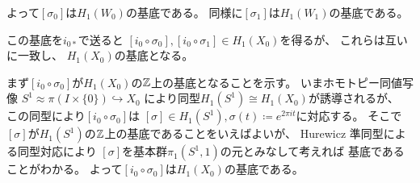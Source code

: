 \documentclass[report]{jlreq}
\begin{document}
\begin{answer}
\begin{innerproof}
        よって$[\sigma_0]$は$H_1(W_0)$の基底である。
        同様に$[\sigma_1]$は$H_1(W_1)$の基底である。
    \end{innerproof}
    この基底を$i_{0*}$で送ると
    $[i_0 \circ \sigma_0], [i_0 \circ \sigma_1] \in H_1(X_0)$を得るが、
    これらは互いに一致し、
    $H_1(X_0)$の基底となる。
    \begin{innerproof}
        まず$[i_0 \circ \sigma_0]$が$H_1(X_0)$の$\mathbb{Z}$上の基底となることを示す。
        いまホモトピー同値写像
        $S^1 \approx \pi(I \times \{ 0 \}) \hookrightarrow X_0$
        により同型$H_1(S^1) \cong H_1(X_0)$が誘導されるが、
        この同型により$[i_0 \circ \sigma_0]$は
        $[\sigma] \in H_1(S^1), \sigma(t) \coloneqq e^{2\pi it}$に対応する。
        そこで$[\sigma]$が$H_1(S^1)$の$\mathbb{Z}$上の基底であることをいえばよいが、
        Hurewicz 準同型による同型対応により
        $[\sigma]$を基本群$\pi_1(S^1, 1)$の元とみなして考えれば
        基底であることがわかる。
        よって$[i_0 \circ \sigma_0]$は$H_1(X_0)$の基底である。


\end{innerproof}
\end{answer}
\end{document}

